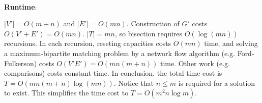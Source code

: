 \documentclass{article}
\begin{document}
~

\noindent\textbf{Runtime}:

$|V'|=O(m+n)$ and $|E'|=O(mn)$. Construction of $G'$ costs $O(V'+E')=O(mn)$. $|T|=mn$, so bisection requires $O(\log(mn))$ recursions. In each recursion, reseting capacities costs $O(mn)$ time, and solving a maximum-bipartite matching problem by a network flow algorithm (e.g. Ford-Fulkerson) costs $O(V'E')=O(mn(m+n))$ time. Other work (e.g. comparisons) costs constant time. In conclusion, the total time cost is $T=O(mn(m+n)\log(mn))$. Notice that $n\leqslant m$ is required for a solution to exist. This simplifies the time cost to $T=O(m^2n\log m)$.
\end{document}

